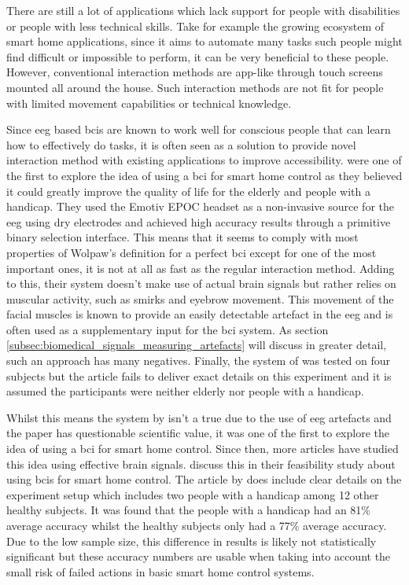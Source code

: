 There are still a lot of applications which lack support for people with disabilities or people with less technical skills.
Take for example the growing ecosystem of smart home applications, since it aims to automate many tasks such people might find difficult or impossible to perform, it can be very beneficial to these people.
However, conventional interaction methods are app-like through touch screens mounted all around the house.
Such interaction methods are not fit for people with limited movement capabilities or technical knowledge.

Since \gls{eeg} based \glspl{bci} are known to work well for conscious people that can learn how to effectively do  tasks, it is often seen as a solution to provide novel interaction method with existing applications to improve accessibility.
 were one of the first to explore the idea of using a \gls{bci} for smart home control as they believed it could greatly improve the quality of life for the elderly and people with a handicap.
They used the Emotiv EPOC headset as a non-invasive source for the \gls{eeg} using dry electrodes and achieved high accuracy results through a primitive binary selection interface.
This means that it seems to comply with most properties of Wolpaw's definition for a perfect \gls{bci} except for one of the most important ones, it is not at all as fast as the regular interaction method.
Adding to this, their system doesn't make use of actual brain signals but rather relies on muscular activity, such as smirks and eyebrow movement.
This movement of the facial muscles is known to provide an easily detectable artefact in the \gls{eeg} and is often used as a supplementary input for the \gls{bci} system.
As section \ref{subsec:biomedical_signals_measuring_artefacts} will discuss in greater detail, such an approach has many negatives.
Finally, the system of \citet{bci_smart_home_app} was tested on four subjects but the article fails to deliver exact details on this experiment and it is assumed the participants were neither elderly nor people with a handicap.

Whilst this means the system by \citet{bci_smart_home_app} isn't a true  due to the use of \gls{eeg} artefacts and the paper has questionable scientific value, it was one of the first to explore the idea of using a \gls{bci} for smart home control.
Since then, more articles have studied this idea using effective brain signals.
 discuss this in their feasibility study about using \glspl{bci} for smart home control.
The article by \citet{feasibility_bci_smart_home} does include clear details on the experiment setup which includes two people with a handicap among 12 other healthy subjects.
It was found that the people with a handicap had an 81\% average accuracy whilst the healthy subjects only had a 77\% average accuracy.
Due to the low sample size, this difference in results is likely not statistically significant but these accuracy numbers are usable when taking into account the small risk of failed actions in basic smart home control systems.

